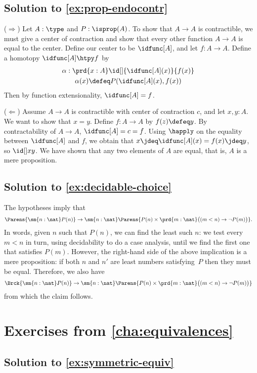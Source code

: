 \documentclass[
%
%
11pt %
]{article}
\begin{document}
\subsection*{Solution to \cref{ex:prop-endocontr}}

($\Rightarrow$) Let $A:\type$ and $P:\isprop(A)$. To show that
$A\to A$ is contractible, we must give a center of contraction and show that
every other function $A\to A$ is equal to the center. Define our center to be
$\idfunc[A]$, and let $f:A\to A$. Define a homotopy $\idfunc[A]\htpy f$ by
\begin{gather*}
  \alpha:\prd{x:A}\id[]{\idfunc[A](x)}{f(x)} \\
  \alpha(x)\defeq P(\idfunc[A](x),f(x))
\end{gather*}
Then by function extensionality, $\idfunc[A]=f$.

($\Leftarrow$) Assume $A\to A$ is contractible with center of contraction $c$,
and let $x,y:A$. We want to show that $x=y$. Define $f:A\to A$ by $f(z)\defeq
y$. By contractability of $A\to A$, $\idfunc[A]=c=f$. Using $\happly$ on the
equality between $\idfunc[A]$ and $f$, we obtain that
$x\jdeq \idfunc[A](x)=f(x)\jdeq y$, so $\id[]xy$. We have shown that any
two elements of $A$ are equal, that is, $A$ is a mere proposition.

\subsection*{Solution to \cref{ex:decidable-choice}}

The hypotheses imply that
\[ \Parens{\sm{n:\nat}P(n)} \to \sm{n:\nat}\Parens{P(n) \times \prd{m:\nat} \big((m<n) \to \neg P(m)\big)}. \]
In words, given $n$ such that $P(n)$, we can find the least such $n$: we test every $m<n$ in turn, using decidability to do a case analysis, until we find the first one that satisfies $P(m)$.
However, the right-hand side of the above implication is a mere proposition: if both $n$ and $n'$ are least numbers satisfying~$P$ then they must be equal.
Therefore, we also have
\[ \Brck{\sm{n:\nat}P(n)} \to \sm{n:\nat}\Parens{P(n) \times \prd{m:\nat} \big((m<n) \to \neg P(m)\big)} \]
from which the claim follows.

\section*{Exercises from \cref{cha:equivalences}}

\subsection*{Solution to \cref{ex:symmetric-equiv}}
\end{document}
